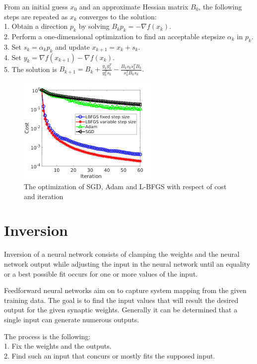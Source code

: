 \noindent From an initial guess $x_0$ and an approximate Hessian matrix $B_0$, the following steps are repeated as $x_k$ converges to the solution:\\
1. Obtain a direction $p_k$ by solving $B_k p_k = - \nabla f(x_k). $ \\
2. Perform a one-dimensional optimization to find an acceptable stepsize $\alpha_k$ in $p_k$. \\
3. Set $s_k = \alpha_k p_k$ and update $x_{k+1} = x_k + s_k.$ \\
4. Set $y_k = \nabla f(x_{k+1}) - \nabla f(x_k).$ \\ 
5. The solution is $B_{k+1} = B_k + \frac{y_k y^T_k}{y^T_k s_k} - \frac{B_k s_k s^T_k B_k}{s^T_k B_k s_k}.$

\begin{figure}[h]
	\centering
	\includegraphics[height=0.34\linewidth]{./figures/optimization}
	\caption{The optimization of SGD, Adam and L-BFGS with respect of cost and iteration}
	\label{fig:optimization}
\end{figure}



\section{Inversion}

Inversion of a neural network consists of clamping the weights and the neural network output while adjusting the input in the neural network until an equality or a best possible fit occurs for one or more values of the input. \medskip

Feedforward neural networks aim on to capture system mapping from the given training data. The goal is to find the input values that will result the desired output for the given synaptic weights. Generally it can be determined that a single input can generate numerous outputs. \bigskip

\noindent The process is the following:\\
1. Fix the weights and the outputs.\\
2. Find such an input that concurs or mostly fits the supposed input. \medskip

